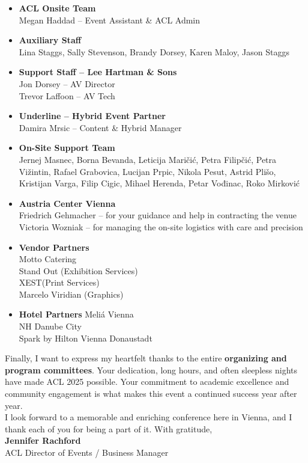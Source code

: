 \begin{itemize}

\item \textbf{ACL Onsite Team}\\
 Megan Haddad – Event Assistant \& ACL Admin


\item \textbf{Auxiliary Staff}\\
 Lina Staggs, Sally Stevenson, Brandy Dorsey, Karen Maloy, Jason Staggs


\item \textbf{Support Staff – Lee Hartman \& Sons}\\
 Jon Dorsey – AV Director\\
 Trevor Laffoon – AV Tech


\item \textbf{Underline – Hybrid Event Partner}\\
 Damira Mrsic – Content \& Hybrid Manager


\item \textbf{On-Site Support Team}\\
 Jernej Masnec, Borna Bevanda, Leticija Maričić, Petra Filipčić, Petra Vižintin, Rafael Grabovica, Lucijan Prpic, Nikola Pesut, Astrid Plišo, Kristijan Varga, Filip Cigic, Mihael Herenda, Petar Vođinac, Roko Mirković


\item \textbf{Austria Center Vienna}\\
 Friedrich Gehmacher – for your guidance and help in contracting the venue\\
 Victoria Wozniak – for managing the on-site logistics with care and precision


\item \textbf{Vendor Partners}\\
 Motto Catering\\
 Stand Out (Exhibition Services)\\
 XEST(Print Services)\\
 Marcelo Viridian (Graphics)\\

\item \textbf{Hotel Partners}
 Meliá Vienna\\
 NH Danube City\\
 Spark by Hilton Vienna Donaustadt\\

\end{itemize}

Finally, I want to express my heartfelt thanks to the entire \textbf{organizing and program committees}. Your dedication, long hours, and often sleepless nights have made ACL 2025 possible. Your commitment to academic excellence and community engagement is what makes this event a continued success year after year.\\

I look forward to a memorable and enriching conference here in Vienna, and I thank each of you for being a part of it.
With gratitude,\\


\textbf{Jennifer Rachford}\\
ACL Director of Events / Business Manager

